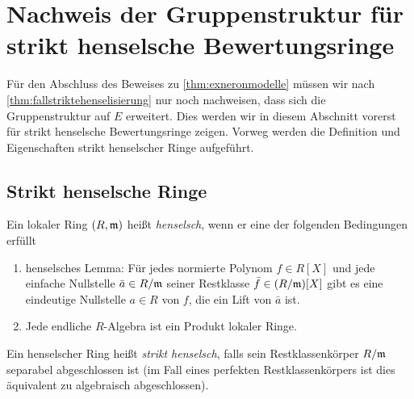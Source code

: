 \section[Gruppenstruktur für strikt henselsche Ringe]%
{Nachweis der Gruppenstruktur für strikt henselsche Bewertungsringe}
\label{chap:gruppestrikthenselsch}
Für den Abschluss des Beweises zu \ref{thm:exneronmodelle} müssen wir
nach \ref{thm:fallstriktehenselisierung} nur noch nachweisen, dass
sich die Gruppenstruktur auf $E$ erweitert.
Dies werden wir in diesem Abschnitt vorerst für strikt henselsche
Bewertungsringe zeigen. Vorweg werden die Definition und Eigenschaften
strikt henselscher Ringe aufgeführt.
\subsection{Strikt henselsche Ringe}
\begin{Definition}\label{def:henselscheringe}
  Ein lokaler Ring $(R,\mathfrak{m})$ heißt \emph{henselsch}, wenn
  er eine der folgenden Bedingungen erfüllt
  \begin{enumerate}[label=(\roman*)]
  \item henselsches Lemma:
    Für jedes normierte Polynom $f\in R[X]$ und jede einfache Nullstelle
    $\bar a\in R/\mathfrak{m}$ seiner Restklasse $\bar f\in (R/\mathfrak{m})[X]$
    gibt es eine eindeutige Nullstelle $a\in R$ von $f$, die ein Lift
    von $\bar a$ ist.
  \item Jede endliche $R$-Algebra ist ein Produkt lokaler Ringe.
  \end{enumerate}
  
  Ein henselscher Ring heißt \emph{strikt henselsch}, falls sein
  Restklassenkörper $R/\mathfrak{m}$ separabel abgeschlossen ist
  (im Fall eines perfekten Restklassenkörpers ist dies äquivalent zu
  algebraisch abgeschlossen).
\end{Definition}

  

